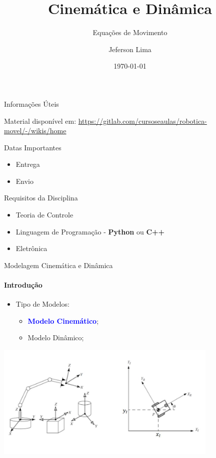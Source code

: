 \documentclass{beamer}
\title{Cinemática e Dinâmica}
\subtitle{Equações de Movimento}
\date{\today}
\author{Jeferson Lima}
\institute{\url{http://gitlab.com/jeferson.lima}}
\newcommand{\pausar}{\pause}
\begin{document}
\maketitle

\begin{frame}{Informações Úteis}
	\begin{block}{Material disponível em:}
		\href{Robótica Móvel - Wiki}{https://gitlab.com/cursoseaulas/robotica-movel/-/wikis/home}
	\end{block}
	\pausar
	\begin{block}{Datas Importantes}
		\begin{itemize}
		\item Entrega
		\item Envio
		\end{itemize}
	\end{block}
	\pausar
	\begin{block}{Requisitos da Disciplina}
		\begin{itemize}
		\item Teoria de Controle
		\item Linguagem de Programação - \textbf{Python} ou \textbf{C++}
		\item Eletrônica
		\end{itemize}
	\end{block}
\end{frame}


\begin{frame}{Modelagem Cinemática e Dinâmica}
    \framesubtitle{Introdução}
    \begin{itemize}
        \item Tipo de Modelos:
        \begin{itemize}
            \item \textbf{\textcolor{blue}{Modelo Cinemático}};
            \item Modelo Dinâmico;
        \end{itemize}
    \end{itemize}
    \begin{center}
        \includegraphics[width=0.8\textwidth]{images/mecanismos.jpg}
    \end{center}
\end{frame}
\end{document}
